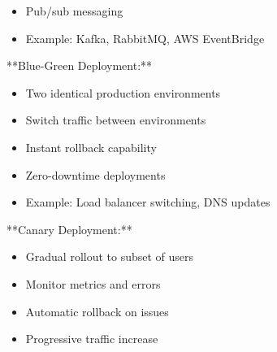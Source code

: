 \documentclass[11pt,a4paper]{article}
\begin{document}
\begin{itemize}
\item Pub/sub messaging
\end{itemize}

\begin{itemize}
\item Example: Kafka, RabbitMQ, AWS EventBridge
\end{itemize}

**Blue-Green Deployment:**

\begin{itemize}
\item Two identical production environments
\end{itemize}

\begin{itemize}
\item Switch traffic between environments
\end{itemize}

\begin{itemize}
\item Instant rollback capability
\end{itemize}

\begin{itemize}
\item Zero-downtime deployments
\end{itemize}

\begin{itemize}
\item Example: Load balancer switching, DNS updates
\end{itemize}

**Canary Deployment:**

\begin{itemize}
\item Gradual rollout to subset of users
\end{itemize}

\begin{itemize}
\item Monitor metrics and errors
\end{itemize}

\begin{itemize}
\item Automatic rollback on issues
\end{itemize}

\begin{itemize}
\item Progressive traffic increase
\end{itemize}
\end{document}
